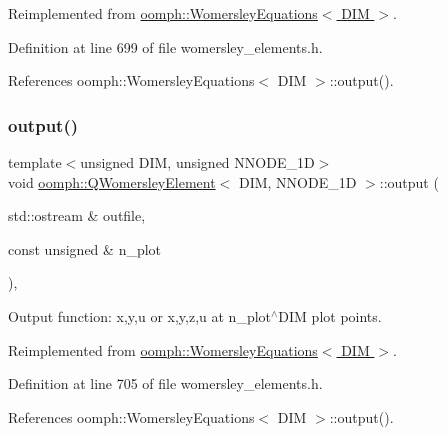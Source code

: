 Reimplemented from \hyperlink{classoomph_1_1WomersleyEquations_a9c1246d883f937888bf052b7078aee9a}{oomph\+::\+Womersley\+Equations$<$ D\+I\+M $>$}.



Definition at line 699 of file womersley\+\_\+elements.\+h.



References oomph\+::\+Womersley\+Equations$<$ D\+I\+M $>$\+::output().

\mbox{\label{classoomph_1_1QWomersleyElement_a98968ff614577c7796f293cb020831da}} 
\subsubsection{\texorpdfstring{output()}{output()}\hspace{0.1cm}{\footnotesize\ttfamily [2/4]}}
{\footnotesize\ttfamily template$<$unsigned D\+IM, unsigned N\+N\+O\+D\+E\+\_\+1D$>$ \\
void \hyperlink{classoomph_1_1QWomersleyElement}{oomph\+::\+Q\+Womersley\+Element}$<$ D\+IM, N\+N\+O\+D\+E\+\_\+1D $>$\+::output (\begin{DoxyParamCaption}\item[{std\+::ostream \&}]{outfile,  }\item[{const unsigned \&}]{n\+\_\+plot }\end{DoxyParamCaption})\hspace{0.3cm}{\ttfamily [inline]}, {\ttfamily [virtual]}}



Output function\+: x,y,u or x,y,z,u at n\+\_\+plot$^\wedge$\+D\+IM plot points. 



Reimplemented from \hyperlink{classoomph_1_1WomersleyEquations_acf07411d652b5c2fc16d5dc309eb6ffc}{oomph\+::\+Womersley\+Equations$<$ D\+I\+M $>$}.



Definition at line 705 of file womersley\+\_\+elements.\+h.



References oomph\+::\+Womersley\+Equations$<$ D\+I\+M $>$\+::output().

\mbox{\label{classoomph_1_1QWomersleyElement_a2d73507033cac13eed334354502663d6}} 
